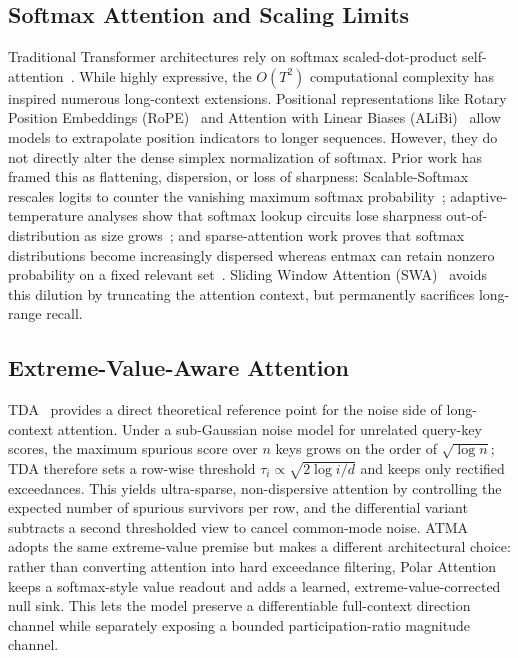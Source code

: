 \documentclass{article} %
\begin{document}
\subsection{Softmax Attention and Scaling Limits}
Traditional Transformer architectures rely on softmax scaled-dot-product self-attention~\citep{Vaswani+2017}. While highly expressive, the $O(T^2)$ computational complexity has inspired numerous long-context extensions. Positional representations like Rotary Position Embeddings (RoPE)~\citep{rope2021} and Attention with Linear Biases (ALiBi)~\citep{alibi2021} allow models to extrapolate position indicators to longer sequences. However, they do not directly alter the dense simplex normalization of softmax. Prior work has framed this as flattening, dispersion, or loss of sharpness: Scalable-Softmax rescales logits to counter the vanishing maximum softmax probability~\citep{nakanishi2025scalable}; adaptive-temperature analyses show that softmax lookup circuits lose sharpness out-of-distribution as size grows~\citep{velickovic2025softmax}; and sparse-attention work proves that softmax distributions become increasingly dispersed whereas entmax can retain nonzero probability on a fixed relevant set~\citep{vasylenko2026sparse}. Sliding Window Attention (SWA)~\citep{beltagy2020longformer} avoids this dilution by truncating the attention context, but permanently sacrifices long-range recall.

\subsection{Extreme-Value-Aware Attention}
TDA~\citep{huang2026threshold} provides a direct theoretical reference point for the noise side of long-context attention. Under a sub-Gaussian noise model for unrelated query-key scores, the maximum spurious score over $n$ keys grows on the order of $\sqrt{\log n}$; TDA therefore sets a row-wise threshold $\tau_i \propto \sqrt{2\log i / d}$ and keeps only rectified exceedances. This yields ultra-sparse, non-dispersive attention by controlling the expected number of spurious survivors per row, and the differential variant subtracts a second thresholded view to cancel common-mode noise. ATMA adopts the same extreme-value premise but makes a different architectural choice: rather than converting attention into hard exceedance filtering, Polar Attention keeps a softmax-style value readout and adds a learned, extreme-value-corrected null sink. This lets the model preserve a differentiable full-context direction channel while separately exposing a bounded participation-ratio magnitude channel.
\end{document}
